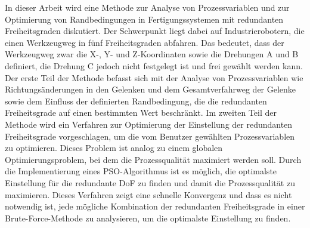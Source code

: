 {%
	In dieser Arbeit wird eine Methode zur Analyse von Prozessvariablen und zur Optimierung von Randbedingungen in Fertigungssystemen mit redundanten Freiheitsgraden diskutiert. Der Schwerpunkt liegt dabei auf Industrierobotern, die einen Werkzeugweg in fünf Freiheitsgraden abfahren. Das bedeutet, dass der Werkzeugweg zwar die X-, Y- und Z-Koordinaten sowie die Drehungen A und B definiert, die Drehung C jedoch nicht festgelegt ist und frei gewählt werden kann. Der erste Teil der Methode befasst sich mit der Analyse von Prozessvariablen wie Richtungsänderungen in den Gelenken und dem Gesamtverfahrweg der Gelenke sowie dem Einfluss der definierten Randbedingung, die die redundanten Freiheitsgrade auf einen bestimmten Wert beschränkt.
	Im zweiten Teil der Methode wird ein Verfahren zur Optimierung der Einstellung der redundanten Freiheitsgrade vorgeschlagen, um die vom Benutzer gewählten Prozessvariablen zu optimieren. Dieses Problem ist analog zu einem globalen Optimierungsproblem, bei dem die Prozessqualität maximiert werden soll. Durch die Implementierung eines \acrshort{PSO}-Algorithmus ist es möglich, die optimalste Einstellung für die redundante DoF zu finden und damit die Prozessqualität zu maximieren. Dieses Verfahren zeigt eine schnelle Konvergenz und dass es nicht notwendig ist, jede mögliche Kombination der redundanten Freiheitsgrade in einer Brute-Force-Methode zu analysieren, um die optimalste Einstellung zu finden.
}%
%
%
